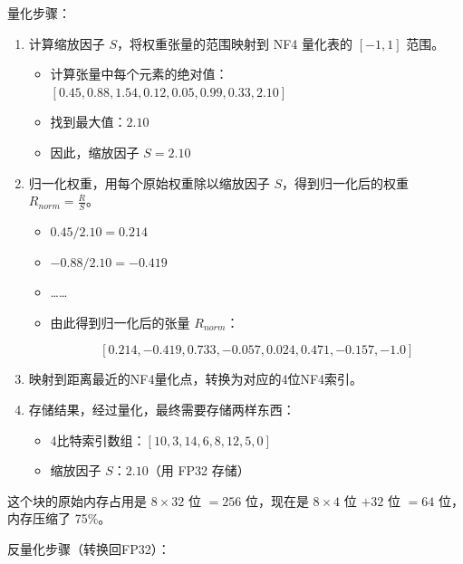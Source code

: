 量化步骤：

\begin{enumerate}
\def\labelenumi{\arabic{enumi}.}
\item
  计算缩放因子 \(S\)，将权重张量的范围映射到 NF4 量化表的 \([-1, 1]\) 范围。

  \begin{itemize}
  \tightlist
  \item
    计算张量中每个元素的绝对值：\([0.45, 0.88, 1.54, 0.12, 0.05, 0.99, 0.33, 2.10]\)
  \item
    找到最大值：\(2.10\)
  \item
    因此，缩放因子 \(S = 2.10\)
  \end{itemize}
\item
  归一化权重，用每个原始权重除以缩放因子 \(S\)，得到归一化后的权重 \(R_{norm} = \frac{R}{S}\)。

  \begin{itemize}
  \tightlist
  \item
    \(0.45 / 2.10 = 0.214\)
  \item
    \(-0.88 / 2.10 = -0.419\)
  \item
    \ldots\ldots{}
  \item
{}
    由此得到归一化后的张量 \(R_{norm}\)：

\[
[0.214, -0.419, 0.733, -0.057, 0.024, 0.471, -0.157, -1.0]
\]
  \end{itemize}
\item
  映射到距离最近的NF4量化点，转换为对应的4位NF4索引。
\item
{}
  存储结果，经过量化，最终需要存储两样东西：

  \begin{itemize}
  \tightlist
  \item
    4比特索引数组：\([10, 3, 14, 6, 8, 12, 5, 0]\)
  \item
    缩放因子 \(S\)：\(2.10\)（用 FP32 存储）
  \end{itemize}
\end{enumerate}

这个块的原始内存占用是 \(8 \times 32\) 位 \(= 256\) 位，现在是 \(8 \times 4\) 位 \(+ 32\) 位 \(= 64\) 位，内存压缩了 75\%。

反量化步骤（转换回FP32）：


